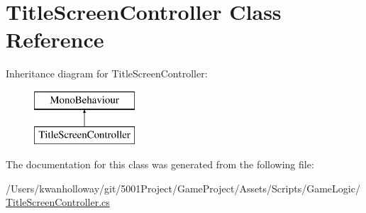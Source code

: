 \hypertarget{class_title_screen_controller}{}\section{Title\+Screen\+Controller Class Reference}
\label{class_title_screen_controller}
Inheritance diagram for Title\+Screen\+Controller\+:\begin{figure}[H]
\begin{center}
\leavevmode
\includegraphics[height=2.000000cm]{class_title_screen_controller}
\end{center}
\end{figure}


The documentation for this class was generated from the following file\+:\begin{DoxyCompactItemize}
\item 
/\+Users/kwanholloway/git/5001\+Project/\+Game\+Project/\+Assets/\+Scripts/\+Game\+Logic/\hyperlink{_title_screen_controller_8cs}{Title\+Screen\+Controller.\+cs}\end{DoxyCompactItemize}
